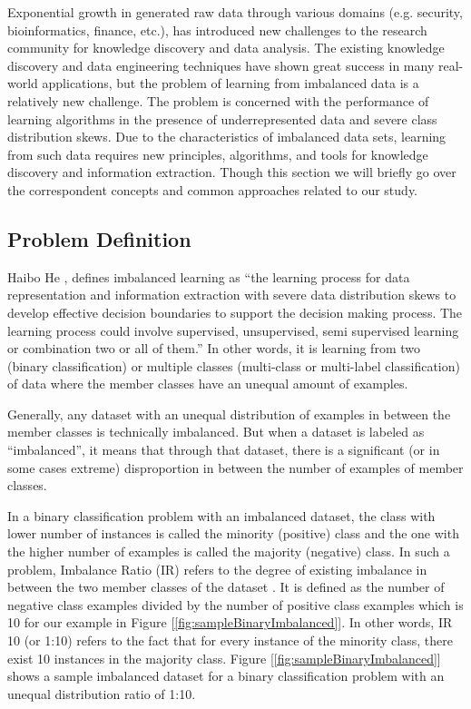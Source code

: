Exponential growth in generated raw data through various domains (e.g. security, bioinformatics, 
finance, etc.), has introduced new challenges to the research community for knowledge discovery 
and data analysis. The existing knowledge discovery and data engineering techniques have shown 
great success in many real-world applications, but the problem of learning from imbalanced data 
is a relatively new challenge. The problem is concerned with the performance of learning algorithms 
in the presence of underrepresented data and severe class distribution skews. Due to the 
characteristics of imbalanced data sets, learning from such data requires new principles, 
algorithms, and tools for knowledge discovery and information extraction. Though this section 
we will briefly go over the correspondent concepts and common approaches related to our study.

\subsection{Problem Definition}
Haibo He \cite{haibo_he_learning_2009}, defines imbalanced learning as “the learning process 
for data representation and information extraction with severe data distribution skews to develop 
effective decision boundaries to support the decision making process. The learning process could 
involve supervised, unsupervised, semi supervised learning or combination two or all of them.” 
In other words, it is learning from two (binary classification) or multiple classes (multi-class 
or multi-label classification) of data where the member classes have an unequal amount of examples.

Generally, any dataset with an unequal distribution of examples in between the member classes 
is technically imbalanced. But when a dataset is labeled as “imbalanced”, it means that through 
that dataset, there is a significant (or in some cases extreme) disproportion in between the number 
of examples of member classes.

In a binary classification problem with an imbalanced dataset, the class with lower number of 
instances is called the minority (positive) class and the one with the higher number of examples 
is called the majority (negative) class. In such a problem, Imbalance Ratio (IR) refers to the 
degree of existing imbalance in between the two member classes of the dataset \cite{orriols-puig_evolutionary_2009}. 
It is defined as the number of negative class examples divided by the number of positive class 
examples which is 10 for our example in Figure [\ref{fig:sampleBinaryImbalanced}]. In other words, 
IR 10 (or 1:10) refers to the fact that for every instance of the minority class, there exist 10 
instances in the majority class.  Figure [\ref{fig:sampleBinaryImbalanced}] shows a sample 
imbalanced dataset for a binary classification problem with an unequal distribution ratio of 1:10.

